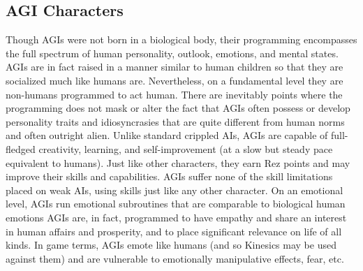 \subsection{AGI Characters}

Though AGIs were not born in a biological body, their 
programming encompasses the full spectrum of human 
personality, outlook, emotions, and mental states. AGIs 
are in fact raised in a manner similar to human children
so that they are socialized much like humans are.
Nevertheless, on a fundamental level they are non-humans
programmed to act human. There are inevitably
points where the programming does not mask or alter 
the fact that AGIs often possess or develop personality 
traits and idiosyncrasies that are quite different from 
human norms and often outright alien.
Unlike standard crippled AIs, AGIs are capable of 
full-fledged creativity, learning, and self-improvement 
(at a slow but steady pace equivalent to humans). Just 
like other characters, they earn Rez points and may 
improve their skills and capabilities. AGIs suffer none 
of the skill limitations placed on weak AIs, using skills 
just like any other character.
On an emotional level, AGIs run emotional subroutines
that are comparable to biological human emotions
AGIs are, in fact, programmed to have empathy
and share an interest in human affairs and prosperity, 
and to place significant relevance on life of all kinds. 
In game terms, AGIs emote like humans (and so Kinesics
may be used against them) and are vulnerable to
emotionally manipulative effects, fear, etc.

